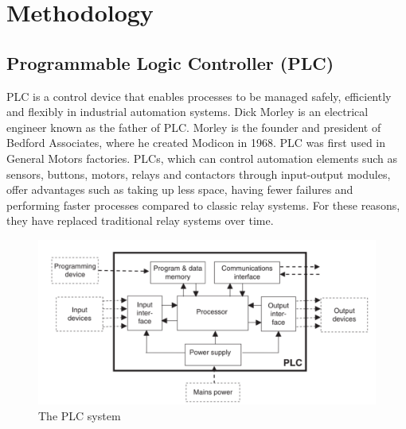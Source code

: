 \doublespacing %

\chapter{ Methodology}
\label{ch3}

\begin{spacing}{1} %
\minitoc %
\end{spacing} %
\thesisspacing %



\section{Programmable Logic Controller (PLC)}

PLC is a control device that enables processes to be managed safely, efficiently and flexibly in industrial automation systems. Dick Morley is an electrical engineer known as the father of PLC. Morley is the founder and president of Bedford Associates, where he created Modicon in 1968. PLC was first used in General Motors factories. PLCs, which can control automation elements such as sensors, buttons, motors, relays and contactors through input-output modules, offer advantages such as taking up less space, having fewer failures and performing faster processes compared to classic relay systems. For these reasons, they have replaced traditional relay systems over time.

\begin{figure}[H]
    \centering
    \includegraphics[width=0.8\columnwidth]{imgs/The PLC system.png}
    \caption[Short description for list of figures]{The PLC system }
    \label{fig-magnitude}
    \end{figure}%


